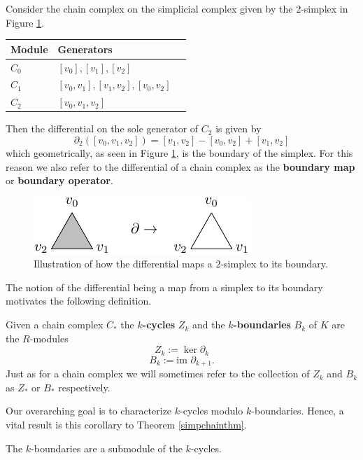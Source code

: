 \begin{example}
  Consider the chain complex on the simplicial complex given by the $2$-simplex in Figure \ref{2simplex}.
\begin{center}
\begin{tabular}{*3l}
  Module & Generators \\ \midrule
  $C_{0}$ & $[v_{0}],[v_{1}],[v_{2}]$ \\
  $C_{1}$ & $[v_{0},v_{1}],[v_{1},v_{2}],[v_{0},v_{2}]$ \\
  $C_{2}$ & $[v_{0},v_{1},v_{2}]$
\end{tabular}
\end{center}
Then the differential on the sole generator of $C_{2}$ is given by
\[\partial_{2}([v_{0},v_{1},v_{2}])=[v_{1},v_{2}]-[v_{0},v_{2}]+[v_{1},v_{2}]\]
which geometrically, as seen in Figure \ref{2simplex}, is the boundary of the simplex. For this reason we also refer to the differential of a chain complex as the \textbf{boundary map} or \textbf{boundary operator}.
\begin{figure}[ht]
  \centering
  \includegraphics[scale=2]{partialtri.pdf}
  \caption{\label{2simplex} Illustration of how the differential maps a $2$-simplex to its boundary.}
\end{figure}
\end{example}
The notion of the differential being a map from a simplex to its boundary motivates the following definition.
\begin{definition}
  Given a chain complex $C_{*}$ the \textbf{$k$-cycles} $Z_{k}$  and the \textbf{$k$-boundaries} $B_{k}$ of $K$ are the $R$-modules
  \[ Z_{k} := \ker \partial_{k}\]
  \[ B_{k} := \textrm{im } \partial_{k+1}.\]
  Just as for a chain complex we will sometimes refer to the collection of $Z_{k}$ and $B_{k}$ as $Z_{*}$ or $B_{*}$ respectively.
\end{definition}
Our overarching goal is to characterize $k$-cycles modulo $k$-boundaries. Hence, a vital result is this corollary to Theorem \ref{simpchainthm}.

\begin{corollary} \label{submodulecycle}
  The $k$-boundaries are a submodule of the $k$-cycles.
\end{corollary}


